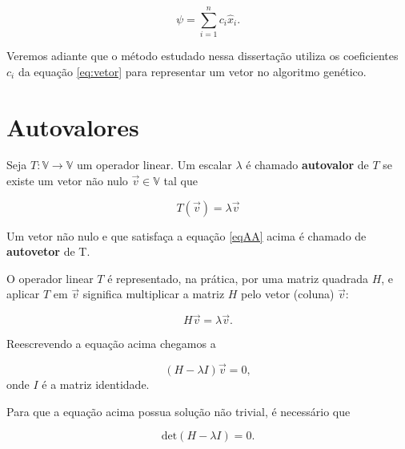 \begin{equation}\label{eq:vetor}
	\psi = \sum_{i=1}^n c_i \hat{x}_i.
\end{equation}


Veremos adiante que o método estudado nessa dissertação utiliza os coeficientes $c_i$ da equação \ref{eq:vetor} para representar um vetor no algoritmo genético.

\section{Autovalores}
	\begin{mydef}
	
		Seja $T: \mathbb{V} \rightarrow \mathbb{V}$ um operador linear. Um escalar $\lambda$ é chamado \textbf{autovalor} de $T$ se existe um vetor não nulo $\vec{v} \in \mathbb{V}$ tal que
		
		\begin{equation}\label{eqAA}
			T(\vec{v}) = \lambda \vec{v}
		\end{equation}
		
		Um vetor não nulo e que satisfaça a equação \ref{eqAA} acima é chamado de \textbf{autovetor} de T.
		
	\end{mydef}
	
	\vspace{1cm}
	
	O operador linear $T$	é representado, na prática, por uma matriz quadrada $H$, e aplicar $T$ em $\vec{v}$ significa multiplicar a matriz $H$ pelo vetor (coluna) $\vec{v}$:
	
	\begin{equation}
		H\vec{v} = \lambda \vec{v}.
	\end{equation}
	
	Reescrevendo a equação acima chegamos a 
	
	\begin{equation}\label{eqEqMatricial}
		(H - \lambda I)\vec{v} = 0,
	\end{equation}
	onde $I$ é a matriz identidade.
	
	Para que a equação acima possua solução não trivial, é necessário que
	
	\begin{equation}\label{eqDeterminanteZeto}	
		\mbox{det}(H - \lambda I) = 0.
	\end{equation}
	
